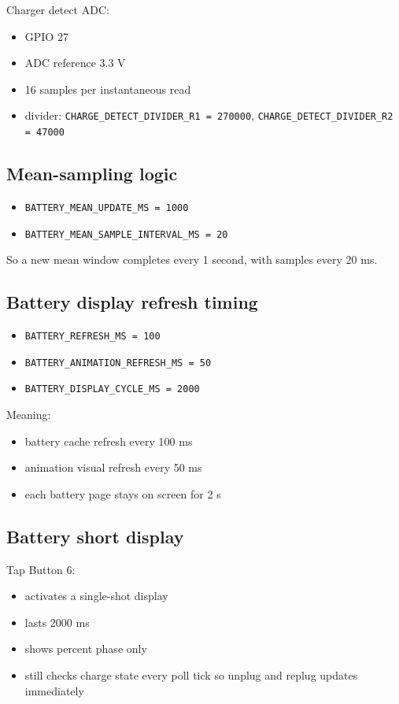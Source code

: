 \documentclass[11pt]{article}
\begin{document}
Charger detect ADC:
\begin{itemize}
  \item GPIO 27
  \item ADC reference 3.3 V
  \item 16 samples per instantaneous read
  \item divider: \texttt{CHARGE\_DETECT\_DIVIDER\_R1 = 270000}, \texttt{CHARGE\_DETECT\_DIVIDER\_R2 = 47000}
\end{itemize}

\subsection{Mean-sampling logic}
\begin{itemize}
  \item \texttt{BATTERY\_MEAN\_UPDATE\_MS = 1000}
  \item \texttt{BATTERY\_MEAN\_SAMPLE\_INTERVAL\_MS = 20}
\end{itemize}

So a new mean window completes every 1 second, with samples every 20 ms.

\subsection{Battery display refresh timing}
\begin{itemize}
  \item \texttt{BATTERY\_REFRESH\_MS = 100}
  \item \texttt{BATTERY\_ANIMATION\_REFRESH\_MS = 50}
  \item \texttt{BATTERY\_DISPLAY\_CYCLE\_MS = 2000}
\end{itemize}

Meaning:
\begin{itemize}
  \item battery cache refresh every 100 ms
  \item animation visual refresh every 50 ms
  \item each battery page stays on screen for 2 s
\end{itemize}

\subsection{Battery short display}
Tap Button 6:
\begin{itemize}
  \item activates a single-shot display
  \item lasts 2000 ms
  \item shows percent phase only
  \item still checks charge state every poll tick so unplug and replug updates immediately
\end{itemize}
\end{document}
